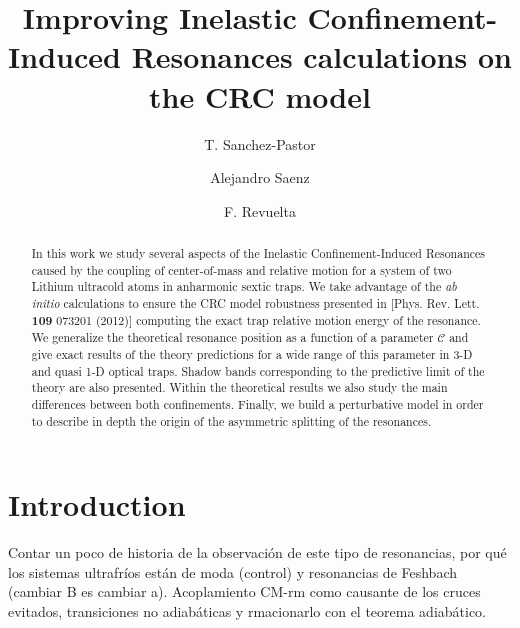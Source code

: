 \documentclass[aps,pre,twocolumn,superscriptaddress,showpacs]{revtex4-1}
\newcommand{\abinitio}{\textit{ab initio }}
\begin{document}
\title{Improving Inelastic Confinement-Induced Resonances calculations on the CRC model}
%
\author{T. Sanchez-Pastor}

\author{Alejandro Saenz}

\author{F. Revuelta}
%
\begin{abstract}
In this work we study several aspects of the Inelastic Confinement-Induced Resonances caused by the coupling of center-of-mass and relative motion for a system of two Lithium ultracold atoms in anharmonic sextic traps. We take advantage of the \abinitio calculations to ensure the CRC model robustness presented in [Phys. Rev. Lett. \textbf{109} 073201 (2012)] computing the exact trap relative motion energy of the resonance. We generalize the theoretical resonance position as a function of a parameter $\mathcal{C}$ and give exact results of the theory predictions for a wide range of this parameter in 3-D and quasi 1-D optical traps. Shadow bands corresponding to the predictive limit of the theory are also presented. Within the theoretical results we also study the main differences between both confinements. Finally, we build a perturbative model in order to describe in depth the origin of the asymmetric splitting of the resonances.
\end{abstract}

\maketitle

\section{Introduction}  \label{sec:intro}
Contar un poco de historia de la observación de este tipo de resonancias, por qué los sistemas ultrafríos están de moda (control) y resonancias de 	Feshbach (cambiar B es cambiar a). 
Acoplamiento CM-rm como causante de los cruces evitados, transiciones no adiabáticas y rmacionarlo con el teorema adiabático.
\end{document}
